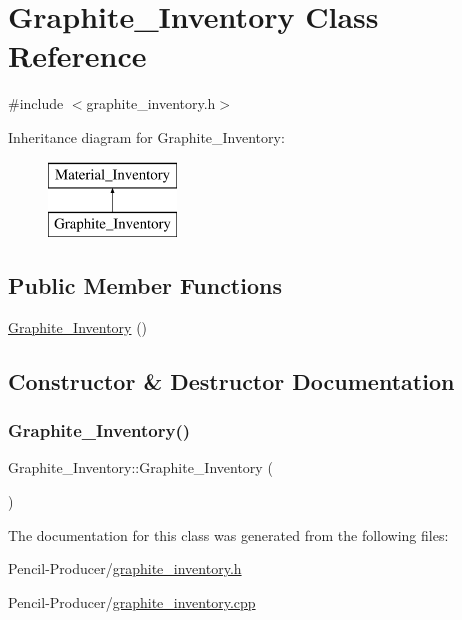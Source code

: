 \hypertarget{classGraphite__Inventory}{}\section{Graphite\+\_\+\+Inventory Class Reference}
\label{classGraphite__Inventory}


{\ttfamily \#include $<$graphite\+\_\+inventory.\+h$>$}

Inheritance diagram for Graphite\+\_\+\+Inventory\+:\begin{figure}[H]
\begin{center}
\leavevmode
\includegraphics[height=2.000000cm]{classGraphite__Inventory}
\end{center}
\end{figure}
\subsection*{Public Member Functions}
\begin{DoxyCompactItemize}
\item 
\mbox{\hyperlink{classGraphite__Inventory_aee64464327d4c5d6eb37d293fa83b5a6}{Graphite\+\_\+\+Inventory}} ()
\end{DoxyCompactItemize}


\subsection{Constructor \& Destructor Documentation}
\mbox{\label{classGraphite__Inventory_aee64464327d4c5d6eb37d293fa83b5a6}} 
\subsubsection{\texorpdfstring{Graphite\_Inventory()}{Graphite\_Inventory()}}
{\footnotesize\ttfamily Graphite\+\_\+\+Inventory\+::\+Graphite\+\_\+\+Inventory (\begin{DoxyParamCaption}{ }\end{DoxyParamCaption})}



The documentation for this class was generated from the following files\+:\begin{DoxyCompactItemize}
\item 
Pencil-\/\+Producer/\mbox{\hyperlink{graphite__inventory_8h}{graphite\+\_\+inventory.\+h}}\item 
Pencil-\/\+Producer/\mbox{\hyperlink{graphite__inventory_8cpp}{graphite\+\_\+inventory.\+cpp}}\end{DoxyCompactItemize}
